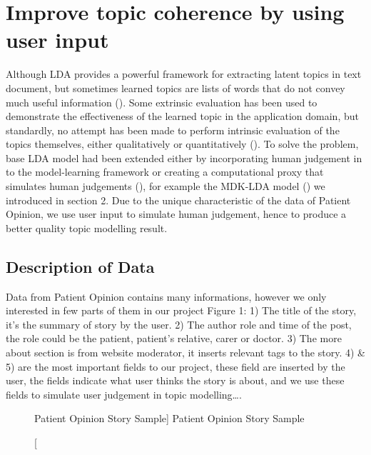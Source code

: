 \documentclass[11pt,twoside]{report}
\begin{document}
\chapter{Improve topic coherence by using user input}

Although LDA provides a powerful framework for extracting latent topics in text document, but sometimes learned topics are lists of words that do not convey much useful information (\cite{ref26}). Some extrinsic evaluation has been used to demonstrate the effectiveness of the learned topic in the application domain, but standardly, no attempt has been made to perform intrinsic evaluation of the topics themselves, either qualitatively or quantitatively (\cite{ref27}). To solve the problem, base LDA model had been extended either by incorporating human judgement in to the model-learning framework or creating a computational proxy that simulates human judgements (\cite{ref28}), for example the MDK-LDA model (\cite{ref24}) we introduced in section 2.
Due to the unique characteristic of the data of Patient Opinion, we use user input to simulate human judgement, hence to produce a better quality topic modelling result.

\section{Description of Data}

Data from Patient Opinion contains many informations, however we only interested in few parts of them in our project Figure 1: 1) The title of the story, it’s the summary of story by the user. 2) The author role and time of the post, the role could be the patient, patient’s relative, carer or doctor. 3) The more about section is from website moderator, it inserts relevant tags to the story. 4) \& 5) are the most important fields to our project, these field are inserted by the user, the fields indicate what user thinks the story is about, and we use these fields to simulate user judgement in topic modelling….
\begin{figure}[h]
    \begin{center}
    \caption
    [Patient Opinion Story Sample]
    {
    Patient Opinion Story Sample
    \label{Figure1}
    }
    \end{center}
\end{figure}
\end{document}
